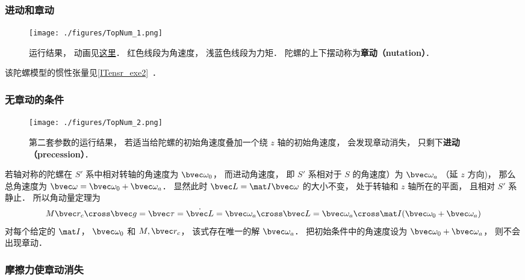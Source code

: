 
\begin{issues}
\issueDraft
\end{issues}


\subsubsection{进动和章动}

\begin{figure}[ht]
\centering
\texttt{[image: ./figures/TopNum\_1.png]}
\caption{运行结果， 动画见\href{https://wuli.wiki/apps/Top.html}{这里}． 红色线段为角速度， 浅蓝色线段为力矩． 陀螺的上下摆动称为\textbf{章动（nutation）}．} \label{TopNum_fig1}
\end{figure}

该陀螺模型的惯性张量见\autoref{ITensr_exe2}~．

\subsubsection{无章动的条件}

\begin{figure}[ht]
\centering
\texttt{[image: ./figures/TopNum\_2.png]}
\caption{第二套参数的运行结果， 若适当给陀螺的初始角速度叠加一个绕 $z$ 轴的初始角速度， 会发现章动消失， 只剩下\textbf{进动（precession）}．} \label{TopNum_fig2}
\end{figure}

若轴对称的陀螺在 $S'$ 系中相对转轴的角速度为 $\bvec\omega_0$， 而进动角速度， 即 $S'$ 系相对于 $S$ 的角速度）为 $\bvec\omega_a$ （延 $z$ 方向)， 那么总角速度为 $\bvec\omega = \bvec\omega_0 + \bvec\omega_a$． 显然此时 $\bvec L = \mat I \bvec\omega$ 的大小不变， 处于转轴和 $z$ 轴所在的平面， 且相对 $S'$ 系静止． 所以角动量定理为
\begin{equation}
M\bvec r_c\cross \bvec g = \bvec\tau = \dot{\bvec L} = \bvec\omega_a\cross\bvec L = \bvec\omega_a\cross \mat I (\bvec\omega_0 + \bvec\omega_a)
\end{equation}
对每个给定的 $\mat I$， $\bvec\omega_0$ 和 $M, \bvec r_c$， 该式存在唯一的解 $\bvec\omega_a$． 把初始条件中的角速度设为 $\bvec\omega_0 + \bvec\omega_a$， 则不会出现章动．

\subsubsection{摩擦力使章动消失}

